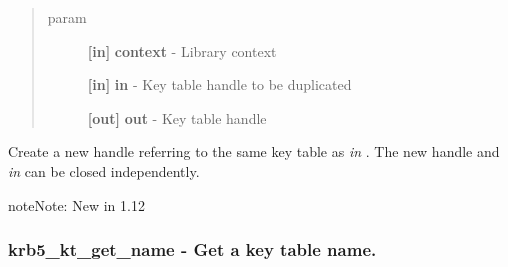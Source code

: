 \documentclass[letterpaper,10pt,english]{sphinxmanual}
\begin{document}
\begin{fulllineitems}
\label{appdev/refs/api/krb5_kt_dup:c.krb5_kt_dup}
\end{fulllineitems}

\begin{quote}\begin{description}
\item[{param}] \leavevmode
\textbf{{[}in{]}} \textbf{context} - Library context

\textbf{{[}in{]}} \textbf{in} - Key table handle to be duplicated

\textbf{{[}out{]}} \textbf{out} - Key table handle

\end{description}\end{quote}

Create a new handle referring to the same key table as \emph{in} . The new handle and \emph{in} can be closed independently.

\begin{notice}{note}{Note:}
New in 1.12
\end{notice}


\subsubsection{krb5\_kt\_get\_name -  Get a key table name.}
\label{appdev/refs/api/krb5_kt_get_name::doc}\label{appdev/refs/api/krb5_kt_get_name:krb5-kt-get-name-get-a-key-table-name}

\begin{fulllineitems}
\label{appdev/refs/api/krb5_kt_get_name:c.krb5_kt_get_name}
\end{fulllineitems}
\end{document}
